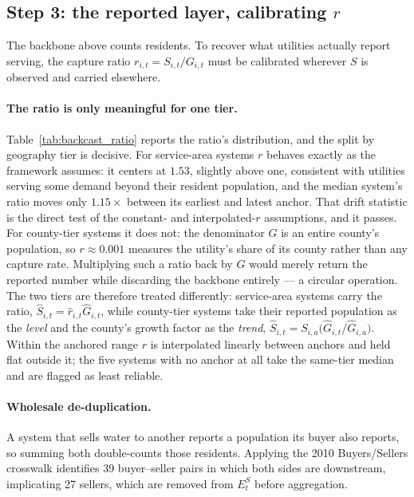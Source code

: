 \documentclass[11pt]{article}
\begin{document}
\subsection{Step 3: the reported layer, calibrating $r$}
\label{sec:backcast-step3}

The backbone above counts residents. To recover what utilities actually
report serving, the capture ratio $r_{i,t}=S_{i,t}/G_{i,t}$ must be calibrated
wherever $S$ is observed and carried elsewhere.

\paragraph{The ratio is only meaningful for one tier.}
Table~\ref{tab:backcast_ratio} reports the ratio's distribution, and the split
by geography tier is decisive. For service-area systems $r$ behaves exactly as
the framework assumes: it centers at $1.53$, slightly above one, consistent
with utilities serving some demand beyond their resident population, and the
median system's ratio moves only $1.15\times$ between its earliest and latest
anchor. That drift statistic is the direct test of the constant- and
interpolated-$r$ assumptions, and it passes. For county-tier systems it does
not: the denominator $G$ is an entire county's population, so
$r\approx 0.001$ measures the utility's share of its county rather than any
capture rate. Multiplying such a ratio back by $G$ would merely return the
reported number while discarding the backbone entirely --- a circular
operation. The two tiers are therefore treated differently: service-area
systems carry the ratio, $\hat S_{i,t}=\hat r_{i,t}\hat G_{i,t}$, while
county-tier systems take their reported population as the \emph{level} and
the county's growth factor as the \emph{trend},
$\hat S_{i,t}=S_{i,a}\bigl(\hat G_{i,t}/\hat G_{i,a}\bigr)$. Within the
anchored range $r$ is interpolated linearly between anchors and held flat
outside it; the five systems with no anchor at all take the same-tier median
and are flagged as least reliable.



\paragraph{Wholesale de-duplication.}
A system that sells water to another reports a population its buyer also
reports, so summing both double-counts those residents. Applying the 2010
Buyers/Sellers crosswalk identifies 39 buyer--seller pairs in which both sides
are downstream, implicating 27 sellers, which are removed from $E^S_t$ before
aggregation.
\end{document}
